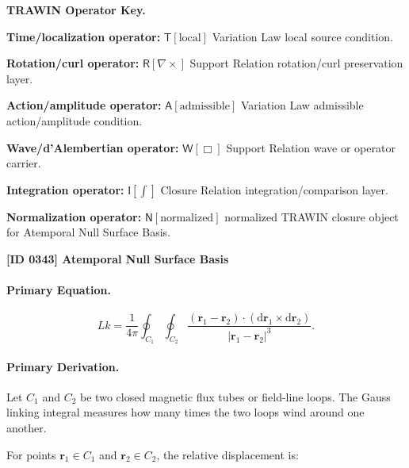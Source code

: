 \par\vspace{0.45\baselineskip}
\noindent\begin{minipage}[t]{\linewidth}
\begingroup
\small
\raggedright
\textbf{TRAWIN Operator Key.}\par
\noindent\textbf{Time/localization operator:} $\mathsf{T}\!\left[\mathrm{local}\right]$ Variation Law local source condition.\par
\noindent\textbf{Rotation/curl operator:} $\mathsf{R}\!\left[\nabla\times\right]$ Support Relation rotation/curl preservation layer.\par
\noindent\textbf{Action/amplitude operator:} $\mathsf{A}\!\left[\mathrm{admissible}\right]$ Variation Law admissible action/amplitude condition.\par
\noindent\textbf{Wave/d'Alembertian operator:} $\mathsf{W}\!\left[\Box\right]$ Support Relation wave or operator carrier.\par
\noindent\textbf{Integration operator:} $\mathsf{I}\!\left[\int\right]$ Closure Relation integration/comparison layer.\par
\noindent\textbf{Normalization operator:} $\mathsf{N}\!\left[\mathrm{normalized}\right]$ normalized TRAWIN closure object for Atemporal Null Surface Basis.\par
\endgroup
\end{minipage}

\clearpage
\noindent\textbf{[ID 0343] Atemporal Null Surface Basis}\par
\vspace{0.35em}
\paragraph{Primary Equation.}
\begin{equation}
Lk
=
\frac{1}{4\pi}
\oint_{C_1}
\oint_{C_2}
\frac{
(\mathbf{r}_1-\mathbf{r}_2)
\cdot
(\mathrm{d}\mathbf{r}_1\times \mathrm{d}\mathbf{r}_2)
}{
|\mathbf{r}_1-\mathbf{r}_2|^3
}.
\end{equation}

\paragraph{Primary Derivation.}
Let $C_1$ and $C_2$ be two closed magnetic flux tubes or field-line loops.  
The Gauss linking integral measures how many times the two loops wind around one another.

For points $\mathbf{r}_1\in C_1$ and $\mathbf{r}_2\in C_2$, the relative displacement is:

